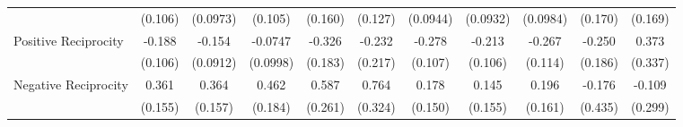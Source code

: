 {\begin{tabular}{l*{10}{c}}
            &     (0.106)         &    (0.0973)         &     (0.105)         &     (0.160)         &     (0.127)         &    (0.0944)         &    (0.0932)         &    (0.0984)         &     (0.170)         &     (0.169)         \\
\addlinespace
Positive Reciprocity&      -0.188         &      -0.154         &     -0.0747         &      -0.326         &      -0.232         &      -0.278\sym{**} &      -0.213\sym{*}  &      -0.267\sym{*}  &      -0.250         &       0.373         \\
            &     (0.106)         &    (0.0912)         &    (0.0998)         &     (0.183)         &     (0.217)         &     (0.107)         &     (0.106)         &     (0.114)         &     (0.186)         &     (0.337)         \\
\addlinespace
Negative Reciprocity&       0.361\sym{*}  &       0.364\sym{*}  &       0.462\sym{*}  &       0.587\sym{*}  &       0.764\sym{*}  &       0.178         &       0.145         &       0.196         &      -0.176         &      -0.109         \\
            &     (0.155)         &     (0.157)         &     (0.184)         &     (0.261)         &     (0.324)         &     (0.150)         &     (0.155)         &     (0.161)         &     (0.435)         &     (0.299)         \\
\bottomrule
\end{tabular}
}
